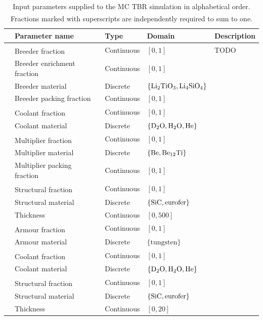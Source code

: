 \begin{table}[h]
	\centering
	{\footnotesize
		\begin{tabular}{l|llll}
		\toprule
		{} & Parameter name & Type & Domain & Description\\
		\midrule
		\parbox[t]{2mm}{}
		& Breeder fraction\textsuperscript{\textdagger} & Continuous & $[0,1]$ & TODO\\
		& Breeder  enrichment fraction & Continuous & $[0,1]$ & {}\\
		& Breeder material & Discrete & $\{\ce{Li2TiO3}, \ce{Li4SiO4}\}$ & {}\\
		& Breeder packing fraction & Continuous & $[0,1]$ & {}\\
		& Coolant fraction\textsuperscript{\textdagger} & Continuous & $[0,1]$ & {}\\
		& Coolant material & Discrete & $\{\ce{D2O}, \ce{H2O}, \ce{He}\}$ & {}\\
		& Multiplier fraction\textsuperscript{\textdagger} & Continuous & $[0,1]$ & {}\\
		& Multiplier material & Discrete & $\{\ce{Be}, \ce{Be12Ti}\}$ & {}\\
		& Multiplier packing fraction & Continuous & $[0,1]$ & {}\\
		& Structural fraction\textsuperscript{\textdagger} & Continuous & $[0,1]$ & {}\\
		& Structural material & Discrete & $\{\ce{SiC}, \text{eurofer}\}$ & {}\\
		& Thickness & Continuous & $[0,500]$ & {}\\
		\midrule
		\parbox[t]{2mm}{}
		& Armour fraction\textsuperscript{\textdaggerdbl} & Continuous & $[0,1]$ & {}\\
		& Armour material & Discrete & $\{\text{tungsten}\}$ & {}\\
		& Coolant fraction\textsuperscript{\textdaggerdbl} & Continuous & $[0,1]$ & {}\\
		& Coolant material & Discrete & $\{\ce{D2O}, \ce{H2O}, \ce{He}\}$ & {}\\
		& Structural fraction\textsuperscript{\textdaggerdbl} & Continuous & $[0,1]$ & {}\\
		& Structural material & Discrete & $\{\ce{SiC}, \text{eurofer}\}$ & {}\\
		& Thickness & Continuous & $[0,20]$ & {}\\
		\bottomrule
		\end{tabular}
	}
	\caption{Input parameters supplied to the MC TBR simulation in alphabetical
		order. Fractions marked with superscripts\textsuperscript{\textdagger
		\textdaggerdbl} are independently required to sum to one.}
	\label{tbl:params}
\end{table}


